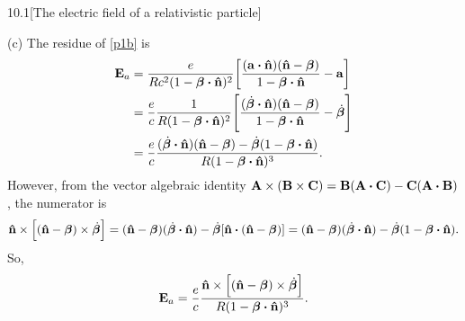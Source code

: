 \documentclass[12pt]{article}
\begin{document}
\begin{problem}{10.1}[The electric field of a relativistic particle]
\begin{solution}
(c) The residue of \eqref{p1b} is
\begin{align}
    \vb{E}_a
    &=\frac{e}{Rc^2(1-\bm\beta\vdot\nhat)^2}\qty[\frac{(\vb{a}\vdot\nhat)(\nhat-\bm\beta)}{1-\bm\beta\vdot\nhat}-\vb{a}]\notag\\
    &=\frac{e}{c}\frac1{R(1-\bm\beta\vdot\nhat)^2}
    \qty[\frac{(\dot{\bm\beta}\vdot\nhat)(\nhat-\bm\beta)}{1-\bm\beta\vdot\nhat}-\dot{\bm\beta}]\notag\\
    &=\frac{e}{c}\frac{(\dot{\bm\beta}\vdot\nhat)(\nhat-\bm\beta)-\dot{\bm\beta}(1-\bm\beta\vdot\nhat)}{R(1-\bm\beta\vdot\nhat)^3}.
\end{align}
However, from the vector algebraic identity
$\vb{A}\times(\vb{B}\times\vb{C})=\vb{B}(\vb{A}\vdot\vb{C})-\vb{C}(\vb{A}\vdot\vb{B})$,
the numerator is
\begin{equation}
    \nhat\times\qty[(\nhat-\bm\beta)\times\dot{\bm\beta}]
    =(\nhat-\bm\beta)(\dot{\bm\beta}\vdot\nhat)
    -\dot{\bm\beta}[\nhat\vdot(\nhat-\bm\beta)]
    =(\nhat-\bm\beta)(\dot{\bm\beta}\vdot\nhat)
    -\dot{\bm\beta}(1-\bm\beta\vdot\nhat).
\end{equation}
So,
\begin{equation}
    \vb{E}_a=\frac{e}{c}\frac{\nhat\times\qty[(\nhat-\bm\beta)\times\dot{\bm\beta}]}{R(1-\bm\beta\vdot\nhat)^3}. 
\end{equation}
\end{solution}
\end{problem}
\newpage
\end{document}
